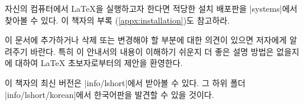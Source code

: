 자신의 컴퓨터에서 \LaTeX 을 실행하고자 한다면 적당한 설치 배포판을 \CTAN|systems|에서 찾아볼 수 있다. 이 책자의 부록 (\ref{appx:installation})도 참고하라.

\noindent 이 문서에 추가하거나 삭제 또는 변경해야 할 부분에 대한 의견이 있으면 저자에게 알려주기 바란다. 특히 이 안내서의 내용이 이해하기 쉬운지 더 좋은 설명 방법은 없을지에 대하여 \LaTeX{} 초보자로부터의 제안을 환영한다.

\bigskip
\begin{verse}
%
\end{verse}

\noindent 이 책자의 최신 버전은 \CTAN|info/lshort|에서 받아볼 수 있다.
그 하위 폴더 \CTAN|info/lshort/korean|에서 한국어판을 발견할 수 있을 것이다.





